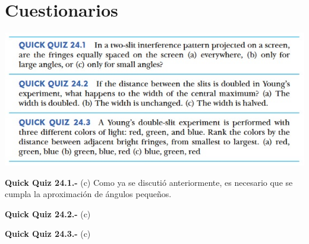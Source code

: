 \documentclass[a4paper,12pt]{article}
\newenvironment{Figure}
  {\par\medskip\noindent\minipage{\linewidth}}
  {\endminipage\par\medskip}
\begin{document}





\section*{Cuestionarios}

    \begin{Figure}
        \centering
        \includegraphics[width=0.8\linewidth]{quiz.jpg}
        \label{fig: cuestionarios}
    \end{Figure}

    \textbf{Quick Quiz 24.1.-} (c) Como ya se discutió anteriormente, es necesario que se cumpla la aproximación de ángulos pequeños.

    \textbf{Quick Quiz 24.2.-} (c)
    
    \textbf{Quick Quiz 24.3.-} (c)




\end{document}
